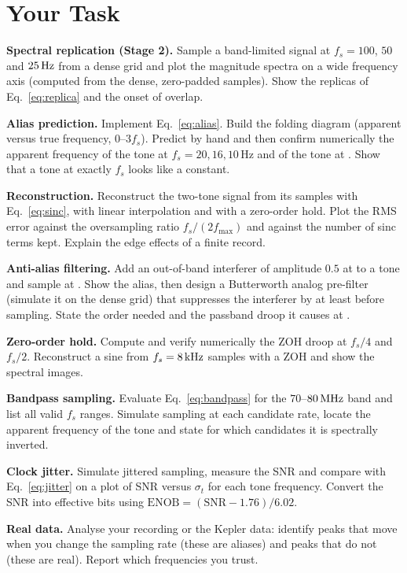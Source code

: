 \documentclass[11pt,a4paper]{article}
\begin{document}
\section*{Your Task}
\begin{tasks}
  \item \textbf{Spectral replication (Stage 2).} Sample a band-limited signal at $f_s=100$, $50$ and $\SI{25}{\hertz}$ from a dense grid and plot the magnitude spectra on a wide frequency axis (computed from the dense, zero-padded samples). Show the replicas of Eq.~\eqref{eq:replica} and the onset of overlap.
  \item \textbf{Alias prediction.} Implement Eq.~\eqref{eq:alias}. Build the folding diagram (apparent versus true frequency, $0$--$3f_s$). Predict by hand and then confirm numerically the apparent frequency of the  tone at $f_s=20,16,10\,\mathrm{Hz}$ and of the  tone at . Show that a tone at exactly $f_s$ looks like a constant.
  \item \textbf{Reconstruction.} Reconstruct the two-tone signal from its samples with Eq.~\eqref{eq:sinc}, with linear interpolation and with a zero-order hold. Plot the RMS error against the oversampling ratio $f_s/(2f_{\max})$ and against the number of sinc terms kept. Explain the edge effects of a finite record.
  \item \textbf{Anti-alias filtering.} Add an out-of-band interferer of amplitude $0.5$ at  to a  tone and sample at . Show the alias, then design a Butterworth analog pre-filter (simulate it on the dense grid) that suppresses the interferer by at least  before sampling. State the order needed and the passband droop it causes at .
  \item \textbf{Zero-order hold.} Compute and verify numerically the ZOH droop at $f_s/4$ and $f_s/2$. Reconstruct a  sine from $f_s=\SI{8}{\kilo\hertz}$ samples with a ZOH and show the spectral images.
  \item \textbf{Bandpass sampling.} Evaluate Eq.~\eqref{eq:bandpass} for the $70$--$\SI{80}{\mega\hertz}$ band and list all valid $f_s$ ranges. Simulate sampling at each candidate rate, locate the apparent frequency of the  tone and state for which candidates it is spectrally inverted.
  \item \textbf{Clock jitter.} Simulate jittered sampling, measure the SNR and compare with Eq.~\eqref{eq:jitter} on a plot of SNR versus $\sigma_t$ for each tone frequency. Convert the SNR into effective bits using $\mathrm{ENOB}=(\mathrm{SNR}-1.76)/6.02$.
  \item \textbf{Real data.} Analyse your recording or the Kepler data: identify peaks that move when you change the sampling rate (these are aliases) and peaks that do not (these are real). Report which frequencies you trust.
\end{tasks}
\end{document}
